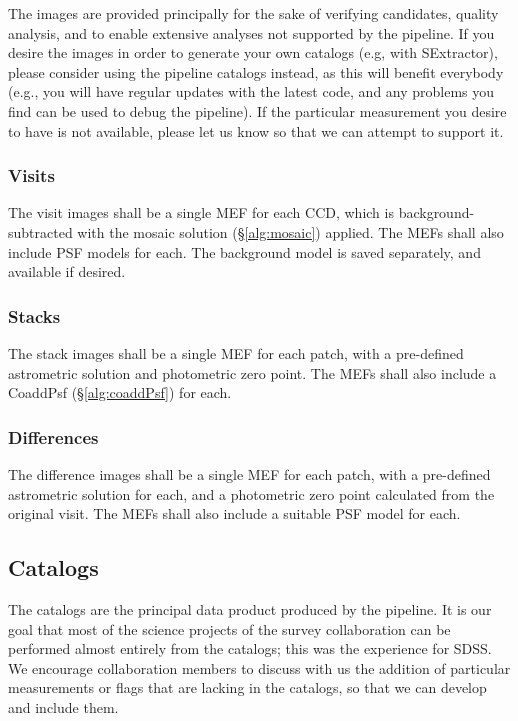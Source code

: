 \documentclass[12pt]{article}
\begin{document}
The images are provided principally for the sake of verifying candidates, quality analysis, and to enable
extensive analyses not supported by the pipeline.  If you desire the images in order to generate your own
catalogs (e.g, with SExtractor), please consider using the pipeline catalogs instead, as this will benefit
everybody (e.g., you will have regular updates with the latest code, and any problems you find can be used to
debug the pipeline).  If the particular measurement you desire to have is not available, please let us
know so that we can attempt to support it.

\subsubsection{Visits}

The visit images shall be a single MEF for each CCD, which is background-subtracted with the mosaic solution
(\S\ref{alg:mosaic}) applied.  The MEFs shall also include PSF models
for each.  The background model is saved separately, and available if desired.

\subsubsection{Stacks}

The stack images shall be a single MEF for each patch, with a pre-defined astrometric solution and photometric
zero point.  The MEFs shall also include a CoaddPsf (\S\ref{alg:coaddPsf}) for each.

\subsubsection{Differences}

The difference images shall be a single MEF for each patch, with a pre-defined astrometric solution for each,
and a photometric zero point calculated from the original visit.  The MEFs shall also include a suitable PSF
model for each.

\subsection{Catalogs}

The catalogs are the principal data product produced by the pipeline.  It is our goal that most of the science
projects of the survey collaboration can be performed almost entirely from the catalogs; this was the
experience for SDSS.  We encourage collaboration members to discuss with us the addition of particular
measurements or flags that are lacking in the catalogs, so that we can develop and include them.
\end{document}
